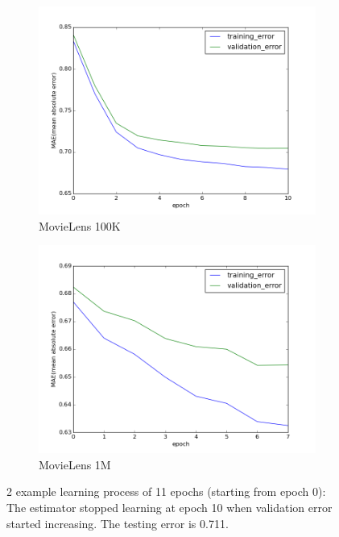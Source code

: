 \documentclass{article}
\begin{document}
\begin{figure}[h]
	\centering
	\begin{subfigure}{0.4\textwidth}
		\includegraphics[width=\textwidth]{movieLens100K}
		\caption{MovieLens 100K}
		\label{fig:movieLens100K}
	\end{subfigure}
	\begin{subfigure}{0.4\textwidth}
		\includegraphics[width=\textwidth]{movieLens1M}
		\caption{MovieLens 1M}
		\label{fig:movieLens1M}
	\end{subfigure}
	\caption{2 example learning process of 11 epochs (starting from epoch 0): 
	The estimator stopped learning at epoch 10 when validation error started 
	increasing. The testing error is 0.711.}
	\label{fig:trainnig}
\end{figure}
\end{document}
